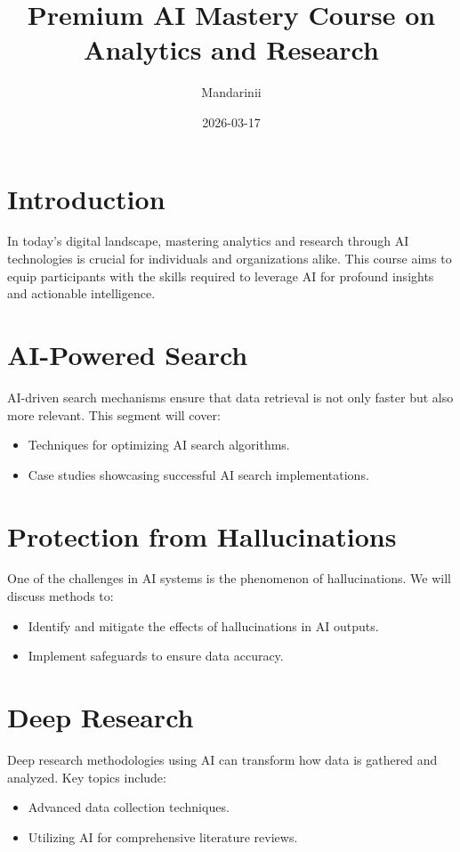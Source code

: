 \documentclass{article}
\title{Premium AI Mastery Course on Analytics and Research}
\author{Mandarinii}
\date{2026-03-17}
\begin{document}
\maketitle

\section{Introduction}
In today’s digital landscape, mastering analytics and research through AI technologies is crucial for individuals and organizations alike. This course aims to equip participants with the skills required to leverage AI for profound insights and actionable intelligence.

\section{AI-Powered Search}
AI-driven search mechanisms ensure that data retrieval is not only faster but also more relevant. This segment will cover:
\begin{itemize}
    \item Techniques for optimizing AI search algorithms.
    \item Case studies showcasing successful AI search implementations.
\end{itemize}

\section{Protection from Hallucinations}
One of the challenges in AI systems is the phenomenon of hallucinations. We will discuss methods to:
\begin{itemize}
    \item Identify and mitigate the effects of hallucinations in AI outputs.
    \item Implement safeguards to ensure data accuracy.
\end{itemize}

\section{Deep Research}
Deep research methodologies using AI can transform how data is gathered and analyzed. Key topics include:
\begin{itemize}
    \item Advanced data collection techniques.
    \item Utilizing AI for comprehensive literature reviews.
\end{itemize}
\end{document}
